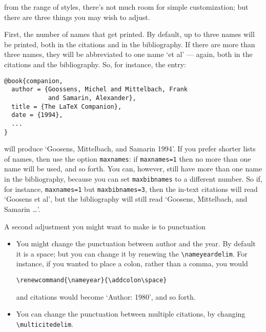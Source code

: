  from the range of styles,
  there's not much room for simple customization; but there are three
things you may wish to adjust.

First, the number of names that get printed. By default, up to three
names will be printed, both in the citations and in the
bibliography. If there are more than three names, they will be
abbreviated to one name `et al' --- again, both in the citations and
the bibliography. So, for instance, the entry:
\begin{verbatim}
@book{companion,
  author = {Goossens, Michel and Mittelbach, Frank 
            and Samarin, Alexander},
  title = {The LaTeX Companion},
  date = {1994},
  ...
}
\end{verbatim}
will produce `Goosens, Mittelbach, and Samarin 1994'. If you prefer shorter lists of names, then use the
option \verb|maxnames|: if \verb|maxnames=1| then no more than one
name will be used, and so forth. You can, however, still have more
than one name in the bibliography, because you can set
\verb|maxbibnames| to a different number. So if, for instance,
\verb|maxnames=1| but \verb|maxbibnames=3|, then the in-text citations
will read `Goosens et al', but the bibliography will still read
`Goosens, Mittelbach, and Samarin \ldots'.

A second adjustment you might want to make is to punctuation
\begin{itemize}
\item You might change the punctuation
between author and the year. By default it is a space; but you can
change it by renewing the \verb|\nameyeardelim|. For instance, if you
wanted to place a colon, rather than a comma, you would
\begin{verbatim}
\renewcommand{\nameyear}{\addcolon\space}
\end{verbatim}
and citations would become `Author: 1980', and so forth.
\item You can change the punctuation between multiple citations, by
  changing \verb|\multicitedelim|.
\end{itemize}

